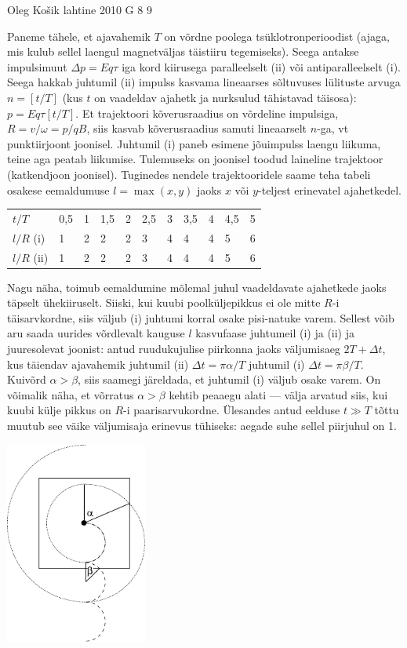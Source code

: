 \documentclass[11pt, twoside]{article}
\begin{document}
{%
{Oleg Košik} %
{lahtine} %
{2010} %
{G 8} %
{9} %
{

\ifSolution
Paneme tähele, et ajavahemik $T$ on võrdne poolega tsüklotronperioodist (ajaga, mis kulub sellel laengul magnetväljas täistiiru tegemiseks).
Seega antakse impulsimuut $\Delta p=Eq\tau$ iga kord kiirusega paralleelselt (ii) 
või antiparalleelselt (i). Seega hakkab juhtumil (ii) impulss kasvama lineaarses sõltuvuses lülituste arvuga $n=[t/T]$ (kus $t$ on vaadeldav
ajahetk ja nurksulud tähistavad täisosa): $p=Eq\tau[t/T]$. Et trajektoori kõverusraadius on võrdeline impulsiga, $R=v/\omega=p/qB$, siis 
kasvab kõverusraadius samuti lineaarselt $n$-ga, vt punktiirjoont joonisel. 
Juhtumil (i) paneb esimene jõuimpulss laengu liikuma, teine aga peatab liikumise. Tulemuseks on joonisel toodud laineline trajektoor (katkendjoon joonisel).
Tuginedes nendele trajektooridele saame teha tabeli osakese eemaldumuse $l = \max (x,y)$ jaoks $x$ või $y$-teljest erinevatel ajahetkedel.

\begin{tabular}{lllllllllll}
	$t/T$ & 0,5 & 1 & 1,5 & 2 & 2,5 & 3 & 3,5 & 4 & 4,5 & 5 \\
	$l/R$ (i) & 1 & 2 & 2 & 2 & 3 & 4 & 4 & 4 & 5 & 6 \\
	$l/R$ (ii) & 1 & 2 & 2 & 2 & 3 & 4 & 4 & 4 & 5 & 6
\end{tabular}

Nagu näha, toimub eemaldumine mõlemal juhul vaadeldavate ajahetkede jaoks täpselt ühekiiruselt. Siiski, kui kuubi poolküljepikkus ei ole 
mitte $R$-i täisarvkordne, siis väljub (i) juhtumi korral osake pisi-natuke varem. Sellest võib aru saada uurides võrdlevalt 
kauguse $l$ kasvufaase juhtumeil (i) ja (ii) ja juuresolevat joonist: antud ruudukujulise piirkonna jaoks väljumisaeg $2T+\Delta t$, kus
täiendav ajavahemik juhtumil (ii) $\Delta t=\pi \alpha/T$ juhtumil (i) $\Delta t=\pi \beta/T$.
Kuivõrd $\alpha > \beta$, siis saamegi järeldada, et juhtumil (i) väljub osake varem. On võimalik näha, et võrratus 
$\alpha > \beta$ kehtib peaaegu alati --- välja arvatud siis, kui kuubi külje pikkus on $R$-i paarisarvukordne.
Ülesandes antud eelduse $t\gg T$ tõttu muutub see väike väljumisaja erinevus tühiseks: aegade suhe sellel piirjuhul on 1.
\begin{center}
	\includegraphics[width=0.35\textwidth]{2010-lahg-08-lah}
\end{center}
\fi
}

}
\end{document}
